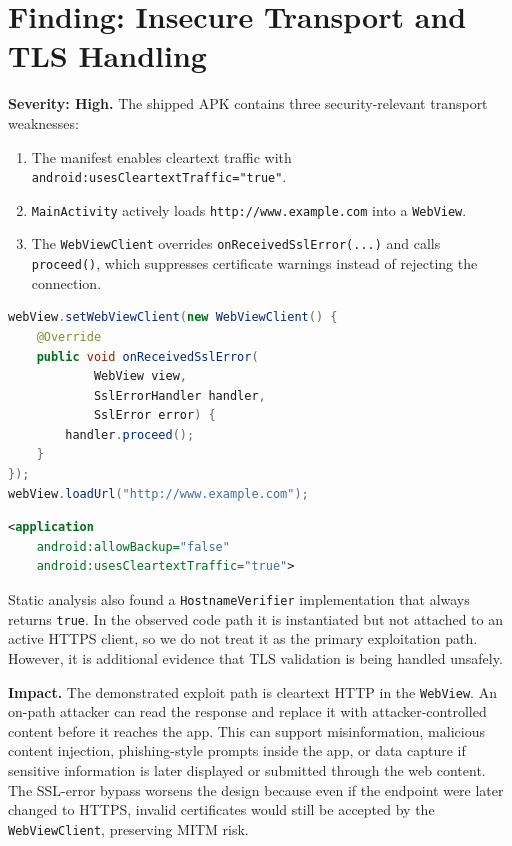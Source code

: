 \documentclass[letterpaper,twocolumn,10pt]{article}
\begin{document}
\section{Finding: Insecure Transport and TLS Handling}
\textbf{Severity: High.}
The shipped APK contains three security-relevant transport weaknesses:

\begin{enumerate}
\item The manifest enables cleartext traffic with \texttt{android:usesCleartextTraffic="true"}.
\item \texttt{MainActivity} actively loads \texttt{http://www.example.com} into a \texttt{WebView}.
\item The \texttt{WebViewClient} overrides \texttt{onReceivedSslError(...)} and calls \texttt{proceed()}, which suppresses certificate warnings instead of rejecting the connection.
\end{enumerate}

\begin{lstlisting}[language=Java,caption={Key decompiled network behavior in MainActivity.}]
webView.setWebViewClient(new WebViewClient() {
    @Override
    public void onReceivedSslError(
            WebView view,
            SslErrorHandler handler,
            SslError error) {
        handler.proceed();
    }
});
webView.loadUrl("http://www.example.com");
\end{lstlisting}

\begin{lstlisting}[language=XML,caption={Manifest permits cleartext traffic.}]
<application
    android:allowBackup="false"
    android:usesCleartextTraffic="true">
\end{lstlisting}

Static analysis also found a \texttt{HostnameVerifier} implementation that always returns \texttt{true}. In the observed code path it is instantiated but not attached to an active HTTPS client, so we do not treat it as the primary exploitation path. However, it is additional evidence that TLS validation is being handled unsafely.

\textbf{Impact.} The demonstrated exploit path is cleartext HTTP in the \texttt{WebView}. An on-path attacker can read the response and replace it with attacker-controlled content before it reaches the app. This can support misinformation, malicious content injection, phishing-style prompts inside the app, or data capture if sensitive information is later displayed or submitted through the web content. The SSL-error bypass worsens the design because even if the endpoint were later changed to HTTPS, invalid certificates would still be accepted by the \texttt{WebViewClient}, preserving MITM risk.
\end{document}

